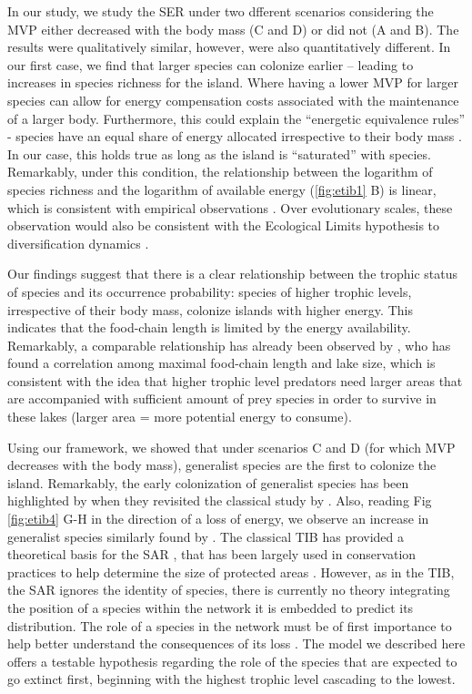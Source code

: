 In our study, we study the SER under two dfferent scenarios considering
the MVP either decreased with the body mass (C and D) or did not (A and
B). The results were qualitatively similar, however, were also
quantitatively different. In our first case, we find that larger species
can colonize earlier -- leading to increases in species richness for the
island. Where having a lower MVP for larger species can allow for energy
compensation costs associated with the maintenance of a larger body.
Furthermore, this could explain the ``energetic equivalence rules''
\citep{Nee1991} - species have an equal share of energy allocated
irrespective to their body mass \citep{Brown2003, Damuth2007}. In our
case, this holds true as long as the island is ``saturated'' with
species. Remarkably, under this condition, the relationship between the
logarithm of species richness and the logarithm of available energy
(\ref{fig:etib1} B) is linear, which is consistent with empirical
observations \citep[see Fig 3. and Fig 4. in][]{Wright1983}. Over
evolutionary scales, these observation would also be consistent with the
Ecological Limits hypothesis to diversification dynamics
\citep{Rabosky2015}.

Our findings suggest that there is a clear relationship between the
trophic status of species and its occurrence probability: species of
higher trophic levels, irrespective of their body mass, colonize islands
with higher energy. This indicates that the food-chain length is limited
by the energy availability. Remarkably, a comparable relationship has
already been observed by \citet{Post2000}, who has found a correlation
among maximal food-chain length and lake size, which is consistent with
the idea that higher trophic level predators need larger areas that are
accompanied with sufficient amount of prey species in order to survive
in these lakes (larger area = more potential energy to consume).

Using our framework, we showed that under scenarios C and D (for which
MVP decreases with the body mass), generalist species are the first to
colonize the island. Remarkably, the early colonization of generalist
species has been highlighted by \citet{Piechnik2008} when they revisited
the classical study by \citet{Simberloff1969}. Also, reading Fig
\ref{fig:etib4} G-H in the direction of a loss of energy, we observe an
increase in generalist species similarly found by \citet{Clavel2011}.
The classical TIB has provided a theoretical basis for the SAR
\citep{MacArthur1967}, that has been largely used in conservation
practices to help determine the size of protected areas
\citep{Neigel2003}. However, as in the TIB, the SAR ignores the identity
of species, there is currently no theory integrating the position of a
species within the network it is embedded to predict its distribution.
The role of a species in the network must be of first importance to help
better understand the consequences of its loss \citep{Saterberg2013}.
The model we described here offers a testable hypothesis regarding the
role of the species that are expected to go extinct first, beginning
with the highest trophic level cascading to the lowest.

